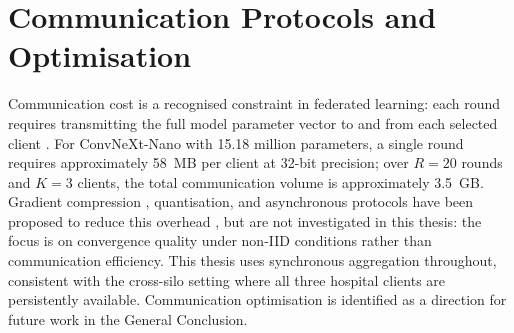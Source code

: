 %
%
%
%
%


\section{Communication Protocols and Optimisation}
\label{sec:communication}

\label{sec:comm-overview}
\label{sec:comm-overhead}
\label{sec:compression}
\label{sec:quantization}
\label{sec:sync-async}

Communication cost is a recognised constraint in federated learning: each round
requires transmitting the full model parameter vector to and from each selected
client \cite{mcmahan2017communication,kairouz2021advances}.
For ConvNeXt-Nano with 15.18 million parameters, a single round requires
approximately 58~MB per client at 32-bit precision; over $R=20$ rounds and $K=3$
clients, the total communication volume is approximately 3.5~GB.
Gradient compression \cite{konecny2016federated}, quantisation, and asynchronous
protocols have been proposed to reduce this overhead \cite{kairouz2021advances},
but are not investigated in this thesis: the focus is on convergence quality
under non-IID conditions rather than communication efficiency.
This thesis uses synchronous aggregation throughout, consistent with the
cross-silo setting where all three hospital clients are persistently available.
Communication optimisation is identified as a direction for future work in the
General Conclusion.


